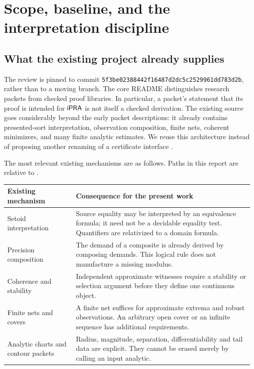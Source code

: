 \section{Scope, baseline, and the interpretation discipline}
\label{sec:foundations}

\subsection{What the existing project already supplies}

The review is pinned to commit
\texttt{5f3be02388442f16487d2dc5c2529961dd783d2b}, rather than to a moving
branch. The core README distinguishes research packets from checked proof
libraries. In particular, a packet's statement that its proof is intended for
\(\mathsf{iPRA}\) is not itself a checked derivation. The existing source goes
considerably beyond the early packet descriptions: it already contains
presented-sort interpretation, observation composition, finite nets, coherent
minimizers, and many finite analytic estimates. We reuse this architecture
instead of proposing another renaming of a certificate interface
\cite{repoMain,repoSetoid,repoExtensional,repoFramework,repoCoherent}.

The most relevant existing mechanisms are as follows. Paths in this report are
relative to .
\begin{center}
\small
\begin{tabular}{p{}p{}}
\toprule
Existing mechanism & Consequence for the present work\\
\midrule
Setoid interpretation &
Source equality may be interpreted by an equivalence formula; it need not be
a decidable equality test. Quantifiers are relativized to a domain formula.\\
Precision composition &
The demand of a composite is already derived by composing demands. This
logical rule does not manufacture a missing modulus.\\
Coherence and stability &
Independent approximate witnesses require a stability or selection argument
before they define one continuous object.\\
Finite nets and covers &
A finite net suffices for approximate extrema and robust observations.
An arbitrary open cover or an infinite sequence has additional requirements.\\
Analytic charts and contour packets &
Radius, magnitude, separation, differentiability and tail data are explicit.
They cannot be erased merely by calling an input analytic.\\
\bottomrule
\end{tabular}
\end{center}

